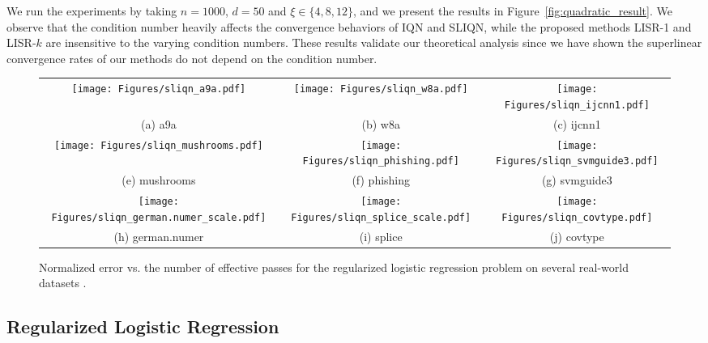 \documentclass[letterpaper]{article} %
\theoremstyle{plain}
\theoremstyle{definition}
\theoremstyle{remark}
\begin{document}
We run the experiments by taking $n=1000$, $d=50$ and $\xi\in\{4,8,12\}$, and we present the results in Figure~\ref{fig:quadratic_result}. 
We observe that the condition number heavily affects the convergence behaviors of IQN and SLIQN, while the proposed methods LISR-1 and LISR-$k$ are insensitive to the varying condition numbers. 
These results validate our theoretical analysis since we have shown the superlinear convergence rates of our methods do not depend on the condition number.

\begin{figure*}[!tb]
\centering
\begin{tabular}{ccc}
     \texttt{[image: Figures/sliqn\_a9a.pdf]}
     & \texttt{[image: Figures/sliqn\_w8a.pdf]}
     & \texttt{[image: Figures/sliqn\_ijcnn1.pdf]} \\
     (a) a9a & (b) w8a &  (c) ijcnn1 \\[0.1cm]
     \texttt{[image: Figures/sliqn\_mushrooms.pdf]}
     & \texttt{[image: Figures/sliqn\_phishing.pdf]}
     & \texttt{[image: Figures/sliqn\_svmguide3.pdf]} \\   
     (e) mushrooms & (f) phishing &  (g) svmguide3 \\[0.1cm]
     \texttt{[image: Figures/sliqn\_german.numer\_scale.pdf]}
     & \texttt{[image: Figures/sliqn\_splice\_scale.pdf]}
     & \texttt{[image: Figures/sliqn\_covtype.pdf]}    \\
     (h) german.numer & (i) splice &  (j) covtype \\[0.1cm]
\end{tabular}
\caption{Normalized error vs. the number of effective passes for the regularized logistic regression problem on several real-world datasets . }
\label{fig:general_res}
\end{figure*}

\subsection{Regularized Logistic Regression}
\end{document}
